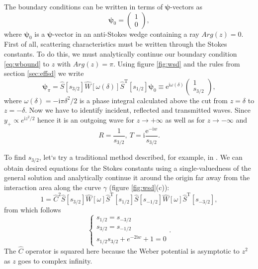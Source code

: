 \documentclass[atmp]{ipart_v1}
\def\rme{\mathrm{e}}
\def\rmi{\mathrm{i}}
\def\psii{\bm\psi}
\def\S{\widehat{S}}
\def\W{\widehat{W}}
\def\C{\widehat{C}}
\def\T{\mathrm{T}}
\def\unity{1}
\def\w{\omega}
\newcommand\eref[1]{\eqref{#1}}
\newcommand\fref[1]{figure \ref{#1}}
\newcommand\sref[1]{section \ref{#1}}
\begin{document}
The boundary conditions can be written in terms of $\psii$-vectors as
\begin{equation}
\psii_0 = \left(\begin{array}{*{2}{c}} 1 \\ 0 \end{array}\right),
\label{eq:wbound}
\end{equation}
where $\psii_0$ is a $\psii$-vector in an anti-Stokes wedge containing a ray $Arg(z)=0$.
First of all, scattering characteristics must be written through the 
Stokes constants. To do this, we must analytically continue our boundary 
condition \eref{eq:wbound} to $z$ with $Arg(z)=\pi$. 
Using \fref{fig:wsd} and the rules from \sref{sec:effsd} we write
\begin{equation}
\psii_{\pi} = 
\S \left[ s_{3/2} \right]
\W \left[ \w(\delta) \right] 
\S^{\T} \left[ s_{1/2} \right] \psii_0 \equiv 
\rme^{\rmi \w(\delta)} \left(\begin{array}{*{2}{c}} 1 \\ s_{3/2} \end{array}\right),
\end{equation}
where $\w(\delta)=-\rmi\pi\delta^2/2$ is a phase integral calculated above the cut 
from $z=\delta$ to $z=-\delta$. Now we have to identify incident, reflected and transmitted waves. 
Since $y_+ \propto e^{\rmi z^2/2}$ hence it is 
an outgoing wave for $z \rightarrow +\infty$ as well as for $z \rightarrow -\infty$ and
\begin{equation}
R = \frac{1}{s_{3/2}},\ T=\rmi\frac{\rme^{-\rmi w}}{s_{3/2}}.
\label{eq:RT}
\end{equation}

To find $s_{3/2}$, let`s try a traditional method described, for example, in \cite{frpaper, rwbook}. 
We can obtain desired equations for the Stokes constants using a single-valuedness of the general 
solution and analytically continue it around the origin far away from the interaction area along the
curve $\gamma$ (\fref{fig:wsd}(c)):
\begin{equation}
\unity = 
\C^2
\S \left[ s_{3/2} \right]
\W \left[ \w \right] 
\S^{\T} \left[ s_{1/2} \right]
\S \left[ s_{-1/2} \right]
\W \left[ \w \right]
\S^{\T} \left[ s_{-3/2} \right],
\end{equation}
from which follows
\begin{equation}
\begin{cases}
s_{1/2} = s_{-3/2}\\
s_{3/2} = s_{-1/2}\\ 
s_{1/2}s_{3/2} + e^{-2 \rmi w} + 1 = 0
\label{eq:webtrad}
\end{cases}.
\end{equation}
The $\C$ operator is squared here because the Weber potential is asymptotic to $z^2$
as $z$ goes to complex infinity.
\end{document}
